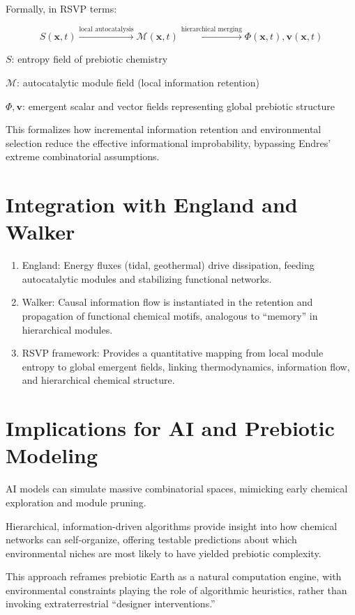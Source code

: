 \documentclass{book}
\begin{document}
Formally, in RSVP terms:

\[S(\mathbf{x}, t) \xrightarrow{\text{local autocatalysis}} \mathcal{M}(\mathbf{x}, t) \xrightarrow{\text{hierarchical merging}} \Phi(\mathbf{x}, t), \mathbf{v}(\mathbf{x}, t)\]

$S$: entropy field of prebiotic chemistry

$\mathcal{M}$: autocatalytic module field (local information retention)

$\Phi, \mathbf{v}$: emergent scalar and vector fields representing global prebiotic structure

This formalizes how incremental information retention and environmental selection reduce the effective informational improbability, bypassing Endres’ extreme combinatorial assumptions.

\section{Integration with England and Walker}
\begin{enumerate}
\item England: Energy fluxes (tidal, geothermal) drive dissipation, feeding autocatalytic modules and stabilizing functional networks.
\item Walker: Causal information flow is instantiated in the retention and propagation of functional chemical motifs, analogous to “memory” in hierarchical modules.
\item RSVP framework: Provides a quantitative mapping from local module entropy to global emergent fields, linking thermodynamics, information flow, and hierarchical chemical structure.
\end{enumerate}

\section{Implications for AI and Prebiotic Modeling}
AI models can simulate massive combinatorial spaces, mimicking early chemical exploration and module pruning.

Hierarchical, information-driven algorithms provide insight into how chemical networks can self-organize, offering testable predictions about which environmental niches are most likely to have yielded prebiotic complexity.

This approach reframes prebiotic Earth as a natural computation engine, with environmental constraints playing the role of algorithmic heuristics, rather than invoking extraterrestrial “designer interventions.”
\end{document}
